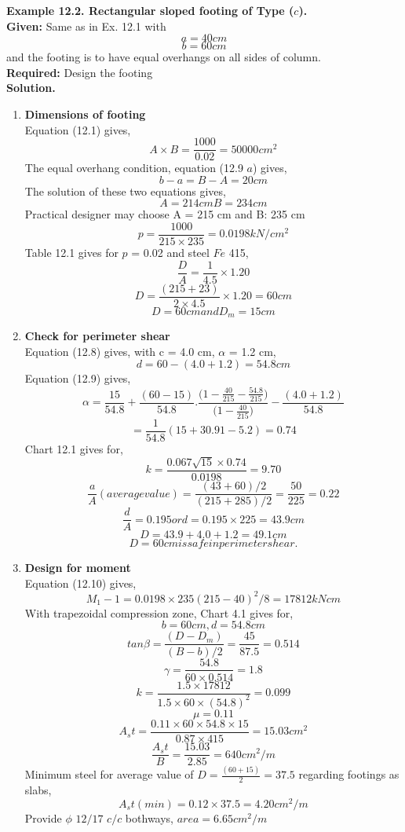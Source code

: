 \textbf{ Example 12.2. Rectangular sloped footing of Type ($c$).}\\
\textbf{Given:}
Same as in Ex. 12.1 with
$$a = 40 cm$$
$$b = 60 cm$$ 
and the footing is to have equal overhangs on all sides of column.\\
\textbf{Required:} Design the footing\\
\textbf{Solution.}
\begin{enumerate}
\item   \textbf{Dimensions of footing}\\
  Equation (12.1) gives,
  $$ A\times B= \frac{1000}{0.02}=50000 cm^2$$
  The equal overhang condition, equation (12.9 $a$) gives,
  $$ b-a=B-A=20 cm$$
  The solution of these two equations gives,
  $$A=214 cm B=234 cm$$
  Practical designer may choose A = 215 cm and B: 235 cm
  $$p=\frac{1000}{215\times235}=0.0198  kN/cm^2$$
  Table 12.1 gives for $p$ = 0.02 and steel $Fe$ 415,
 $$\frac{D}{A}=\frac{1}{4.5}\times1.20$$
 $$D=\frac{(215+23)}{2 \times 4.5} \times 1.20=60cm$$
 $$D=60cm and D_m=15cm$$
 
\item  \textbf{Check for perimeter shear}\\
 Equation (12.8) gives, with c = 4.0 cm, $\alpha$ = 1.2 cm,
 $$d=60-(4.0+1.2)=54.8cm$$
 Equation (12.9) gives,
 $$ \alpha=\frac{15}{54.8}+\frac{(60-15)}{54.8}.\frac{\Bigg(1-\frac{40}{215}-\frac{54.8}{215}\Bigg)}{\Bigg(1-\frac{40}{215}\Bigg)}-\frac{(4.0+1.2)}{54.8}$$
 $$=\frac{1}{54.8}(15+30.91-5.2)=0.74$$
 Chart 12.1 gives for,
 $$ k=\frac{0.067\sqrt{15}\times0.74}{0.0198}=9.70$$
 $$\frac{a}{A}(average value)=\frac{(43+60)/2}{(215+285)/2}=\frac{50}{225}=0.22$$
 $$\frac{d}{A}=0.195 or d=0.195\times225=43.9 cm$$
 $$D=43.9+4.0+1.2=49.1 cm$$
 $$D=60cm is safe in perimeter shear.$$
 
\item  \textbf{Design for moment}\\
   Equation (12.10) gives,
   $$M_1-1=0.0198 \times 235(215-40)^2/8=17812 kN cm$$
   With trapezoidal compression zone, Chart 4.1 gives for,
   $$b=60cm, d=54.8 cm$$
   $$tan\beta =\frac{(D-D_m)}{(B-b)/2}=\frac{45}{87.5}=0.514$$
   $$\gamma=\frac{54.8}{60\times0.514}=1.8$$
   $$k=\frac{1.5 \times 17812}{1.5 \times 60 \times (54.8)^2}=0.099$$
   $$\mu=0.11$$
   $$A_st=\frac{0.11 \times 60 \times 54.8 \times 15}{0.87 \times 415}=15.03cm^2$$
   $$\frac{A_st}{B}=\frac{15.03}{2.85}=640 cm^2/m$$
  Minimum steel for average value of $D =\frac{(60+15)}{2}=37.5$ regarding footings as slabs,
  $$A_st(min)=0.12\times 37.5=4.20 cm^2/m$$
  Provide $\phi$ $12/17$ $c/c$ bothways, $area=6.65 cm^2/m$
  

\end{enumerate}
